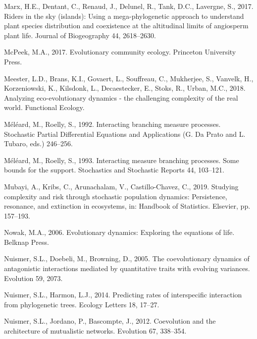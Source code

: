 \documentclass[]{elsarticle} %
\begin{document}
\leavevmode\hypertarget{ref-Marx2017}{}%
Marx, H.E., Dentant, C., Renaud, J., Delunel, R., Tank, D.C., Lavergne,
S., 2017. Riders in the sky (islands): Using a mega-phylogenetic
approach to understand plant species distribution and coexistence at the
altitudinal limits of angiosperm plant life. Journal of Biogeography 44,
2618--2630.

\leavevmode\hypertarget{ref-markmcpeek2017}{}%
McPeek, M.A., 2017. Evolutionary community ecology. Princeton University
Press.

\leavevmode\hypertarget{ref-DeMeester2018}{}%
Meester, L.D., Brans, K.I., Govaert, L., Souffreau, C., Mukherjee, S.,
Vanvelk, H., Korzeniowski, K., Kilsdonk, L., Decaestecker, E., Stoks,
R., Urban, M.C., 2018. Analyzing eco-evolutionary dynamics - the
challenging complexity of the real world. Functional Ecology.

\leavevmode\hypertarget{ref-meleard1992interacting}{}%
Méléard, M., Roelly, S., 1992. Interacting branching measure processes.
Stochastic Partial Differential Equations and Applications (G. Da Prato
and L. Tubaro, eds.) 246--256.

\leavevmode\hypertarget{ref-Mlard1993}{}%
Méléard, M., Roelly, S., 1993. Interacting measure branching processes.
Some bounds for the support. Stochastics and Stochastic Reports 44,
103--121.

\leavevmode\hypertarget{ref-Mubayi2019}{}%
Mubayi, A., Kribs, C., Arunachalam, V., Castillo-Chavez, C., 2019.
Studying complexity and risk through stochastic population dynamics:
Persistence, resonance, and extinction in ecosystems, in: Handbook of
Statistics. Elsevier, pp. 157--193.

\leavevmode\hypertarget{ref-9780674023383}{}%
Nowak, M.A., 2006. Evolutionary dynamics: Exploring the equations of
life. Belknap Press.

\leavevmode\hypertarget{ref-Nuismer2005}{}%
Nuismer, S.L., Doebeli, M., Browning, D., 2005. The coevolutionary
dynamics of antagonistic interactions mediated by quantitative traits
with evolving variances. Evolution 59, 2073.

\leavevmode\hypertarget{ref-Nuismer2014}{}%
Nuismer, S.L., Harmon, L.J., 2014. Predicting rates of interspecific
interaction from phylogenetic trees. Ecology Letters 18, 17--27.

\leavevmode\hypertarget{ref-Nuismer2012}{}%
Nuismer, S.L., Jordano, P., Bascompte, J., 2012. Coevolution and the
architecture of mutualistic networks. Evolution 67, 338--354.
\end{document}
